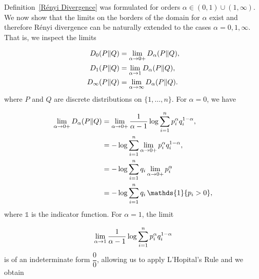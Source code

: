 Definition~\ref{Rényi Divergence} was formulated for orders $\alpha \in (0,1) \cup (1,\infty)$. We now show that the limits on the borders of the domain for $\alpha$ exist and therefore Rényi divergence can be naturally extended to the cases $\alpha=0,1,\infty$. That is, we inspect the limits

\begin{align*}
	D_0(P \| Q) &= \lim_{\alpha \rightarrow 0+} D_\alpha(P \| Q), \\
	D_1(P \| Q) &= \lim_{\alpha \rightarrow 1} D_\alpha(P \| Q), \\
	D_\infty(P \| Q) &= \lim_{\alpha \rightarrow \infty} D_\alpha(P \| Q).
\end{align*}
where $P$ and $Q$ are discrete distributions on $\{1,\dots,n\}$. For $\alpha = 0$, we have

\begin{equation}
\begin{aligned}
		\lim_{\alpha \goto 0+} D_\alpha(P \| Q) &= \lim_{\alpha \goto 0+} \frac{1}{\alpha-1} \log \sum_{i=1}^{n} p_i^\alpha q_i^{1-\alpha}, \\
		&= - \log \sum_{i=1}^{n} \lim_{\alpha \goto 0+} p_i^\alpha q_i^{1-\alpha}, \\
		&= - \log \sum_{i=1}^{n} q_i \lim_{\alpha \goto 0+} p_i^\alpha \\
		&= - \log \sum_{i=1}^{n} q_i \, \mathds{1}\{p_i>0\},
		\label{Rényi_0}
\end{aligned}
\end{equation}
where $\mathds{1}$ is the indicator function. For $\alpha = 1$, the limit

\begin{equation*}
	\lim_{\alpha \rightarrow 1} \frac{1}{\alpha-1} \log \sum_{i=1}^{n} p_i^\alpha q_i^{1-\alpha}
\end{equation*}
is of an indeterminate form $\dfrac{0}{0}$, allowing us to apply L'Hopital's Rule and we obtain


